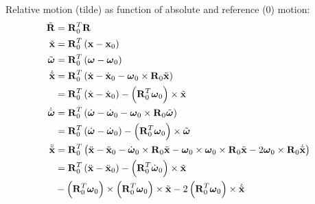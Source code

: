 \documentclass[10pt,dvips,fleqn,subeqn]{report}
\newcommand{\T}[1]{\bm{\mathbf{#1}}}
\newcommand{\TT}[1]{\bm{\mathbf{#1}}}
\begin{document}
Relative motion (tilde) as function of absolute and reference (0) motion:
\begin{subequations}
\begin{align}
	\tilde{\TT{R}} &= \TT{R}_0^T \TT{R} \\
	\tilde{\T{x}} &= \TT{R}_0^T\plbr{\T{x} - \T{x}_0} \\
	\tilde{\T{\omega}} &= \TT{R}_0^T\plbr{\T{\omega} - \T{\omega}_0} \\
	\dot{\tilde{\T{x}}} &= \TT{R}_0^T\plbr{
		\dot{\T{x}} - \dot{\T{x}}_0
		- \T{\omega}_0 \times \TT{R}_0 \tilde{\T{x}}
	} \nonumber \\
	&= \TT{R}_0^T\plbr{
		\dot{\T{x}} - \dot{\T{x}}_0
	} - \plbr{\TT{R}_0^T \T{\omega}_0} \times \tilde{\T{x}} \\
	\dot{\tilde{\T{\omega}}} &= \TT{R}_0^T\plbr{
		\dot{\T{\omega}}
		- \dot{\T{\omega}}_0
		- \T{\omega}_0 \times \TT{R}_0 \tilde{\T{\omega}}
	} \nonumber \\
	&= \TT{R}_0^T\plbr{
		\dot{\T{\omega}}
		- \dot{\T{\omega}}_0
	} - \plbr{\TT{R}_0^T \T{\omega}_0} \times \tilde{\T{\omega}} \\
	\ddot{\tilde{\T{x}}} &= \TT{R}_0^T\plbr{
		\ddot{\T{x}}
		- \ddot{\T{x}}_0
		- \dot{\T{\omega}}_0 \times \TT{R}_0 \tilde{\T{x}}
		- \T{\omega}_0 \times \T{\omega}_0 \times \TT{R}_0 \tilde{\T{x}}
		- 2 \T{\omega}_0 \times \TT{R}_0 \dot{\tilde{\T{x}}}
	} \nonumber \\
 	&= \TT{R}_0^T\plbr{
		\ddot{\T{x}}
		- \ddot{\T{x}}_0
	} - \plbr{\TT{R}_0^T \dot{\T{\omega}}_0} \times \tilde{\T{x}} \nonumber \\
	& \mbox{} - \plbr{\TT{R}_0^T \T{\omega}_0} \times \plbr{\TT{R}_0^T \T{\omega}_0} \times \tilde{\T{x}}
		- 2 \plbr{\TT{R}_0^T \T{\omega}_0} \times \dot{\tilde{\T{x}}}
\end{align}
\end{subequations}
\end{document}
